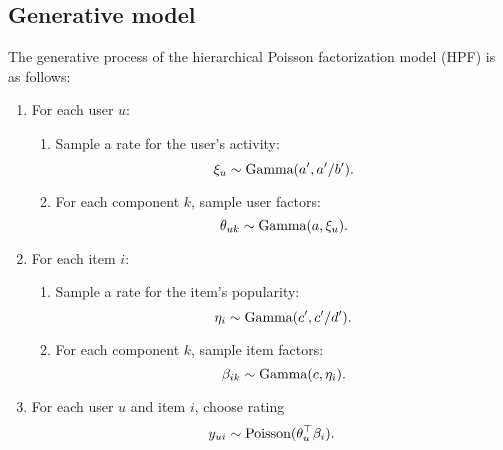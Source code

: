 \subsection{Generative model}
The generative process of the hierarchical Poisson factorization model
(HPF) is as follows:
\begin{enumerate}
\item For each user $u$:
  \begin{enumerate}
    \item Sample a rate for the user's activity:
      \begin{equation*}
        \xi_u \sim \textrm{Gamma}(a', a'/b').
      \end{equation*}
    \item For each component $k$, sample user factors:
      \begin{equation*}
        \theta_{uk} \sim \textrm{Gamma}(a, \xi_u).
      \end{equation*}
  \end{enumerate}

\item For each item $i$:
  \begin{enumerate}
    \item Sample a rate for the item's popularity:
      \begin{equation*}
        \eta_i \sim \textrm{Gamma}(c', c'/d').
      \end{equation*}
    \item For each component $k$, sample item factors:
      \begin{equation*}
        \beta_{ik} \sim \textrm{Gamma}(c, \eta_i).
      \end{equation*}
  \end{enumerate}

\item For each user $u$ and item $i$, choose rating
  \begin{equation*}
    y_{ui} \sim \textrm{Poisson}(\theta_u^\top \beta_i).
  \end{equation*}
\end{enumerate}



